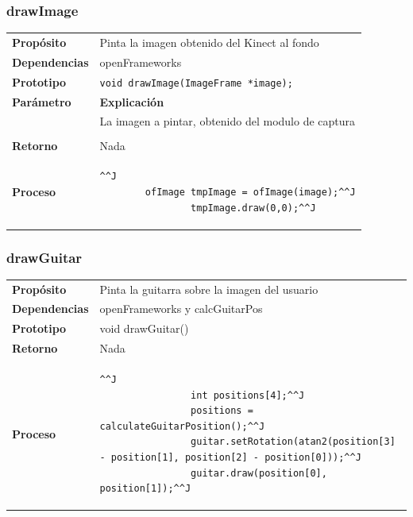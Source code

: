 \documentclass[a4paper,12pt]{article}
\begin{document}
\subsubsection{drawImage}
\begin{tabularx}{\textwidth}{p{25mm} X}
        \textbf{Propósito} & Pinta la imagen obtenido del Kinect al fondo\\
        \textbf{Dependencias} & openFrameworks \\
        \textbf{Prototipo} & \lstinline{void drawImage(ImageFrame *image);}\\
        \textbf{Parámetro} & \textbf{Explicación} \\
        \begin{tabular}{p{2cm} l}
               image & La imagen a pintar, obtenido del modulo de captura\\
        \end{tabular}\\

        \textbf{Retorno} & Nada\\
        \textbf{Proceso} & 
        \begin{lstlisting}[breaklines=true]^^J
        ofImage tmpImage = ofImage(image);^^J
                tmpImage.draw(0,0);^^J
        \end{lstlisting}

\end{tabularx}
\subsubsection{drawGuitar}
\begin{tabularx}{\textwidth}{p{25mm} X}
        \textbf{Propósito} & Pinta la guitarra sobre la imagen del usuario\\
        \textbf{Dependencias} & openFrameworks y calcGuitarPos\\
        \textbf{Prototipo} & void drawGuitar()\\
        \textbf{Retorno} & Nada \\
        \textbf{Proceso} & 
        \begin{lstlisting}[breaklines=true]^^J
                int positions[4];^^J
                positions = calculateGuitarPosition();^^J
                guitar.setRotation(atan2(position[3] - position[1], position[2] - position[0]));^^J
                guitar.draw(position[0], position[1]);^^J
        \end{lstlisting}
\end{tabularx}
\end{document}
